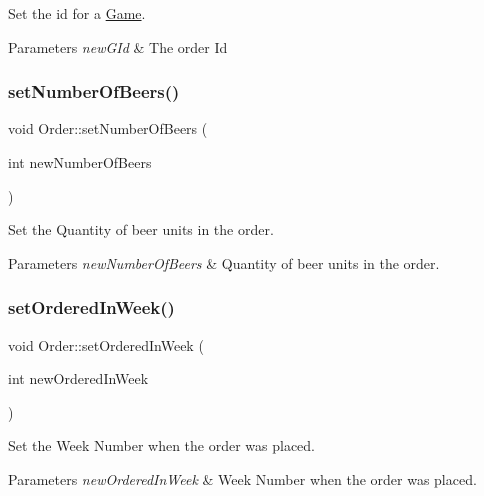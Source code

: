 Set the id for a \hyperlink{classGame}{Game}. 
\begin{DoxyParams}{Parameters}
{\em new\+G\+Id} & The order Id \\
\hline
\end{DoxyParams}
\mbox{\label{classOrder_aa0254aa87207ff328057e5d5b03e4bf0}} 
\subsubsection{\texorpdfstring{set\+Number\+Of\+Beers()}{setNumberOfBeers()}}
{\footnotesize\ttfamily void Order\+::set\+Number\+Of\+Beers (\begin{DoxyParamCaption}\item[{int}]{new\+Number\+Of\+Beers }\end{DoxyParamCaption})}

Set the Quantity of beer units in the order. 
\begin{DoxyParams}{Parameters}
{\em new\+Number\+Of\+Beers} & Quantity of beer units in the order. \\
\hline
\end{DoxyParams}
\mbox{\label{classOrder_a2c98b59a17d5fd4094f180b381d0206a}} 
\subsubsection{\texorpdfstring{set\+Ordered\+In\+Week()}{setOrderedInWeek()}}
{\footnotesize\ttfamily void Order\+::set\+Ordered\+In\+Week (\begin{DoxyParamCaption}\item[{int}]{new\+Ordered\+In\+Week }\end{DoxyParamCaption})}

Set the Week Number when the order was placed. 
\begin{DoxyParams}{Parameters}
{\em new\+Ordered\+In\+Week} & Week Number when the order was placed. \\
\hline
\end{DoxyParams}
\mbox{\label{classOrder_a1b61f0f2a914b59826f5b4792e8ccc50}} 
